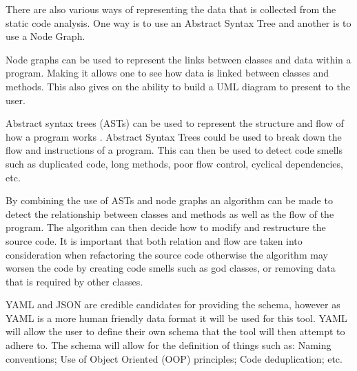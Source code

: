 There are also various ways of representing the data that is collected from the static code analysis. One way is to use an Abstract Syntax Tree \citep{8802820} and another is to use a Node Graph.

Node graphs can be used to represent the links between classes and data within a program. Making it allows one to see how data is linked between classes and methods. This also gives on the ability to build a UML diagram to present to the user.

Abstract syntax trees (ASTs) can be used to represent the structure and flow of how a program works \citep{8802820}. Abstract Syntax Trees could be used to break down the flow and instructions of a program. This can then be used to detect code smells such as duplicated code, long methods, poor flow control, cyclical dependencies, etc.

By combining the use of ASTs and node graphs an algorithm can be made to detect the relationship between classes and methods as well as the flow of the program. The algorithm can then decide how to modify and restructure the source code. It is important that both relation and flow are taken into consideration when refactoring the source code otherwise the algorithm may worsen the code by creating code smells such as god classes, or removing data that is required by other classes.

YAML and JSON are credible candidates for providing the schema, however as YAML is a more human friendly data format it will be used for this tool. YAML will allow the user to define their own schema that the tool will then attempt to adhere to. The schema will allow for the definition of things such as: Naming conventions; Use of Object Oriented (OOP) principles; Code deduplication; etc.

